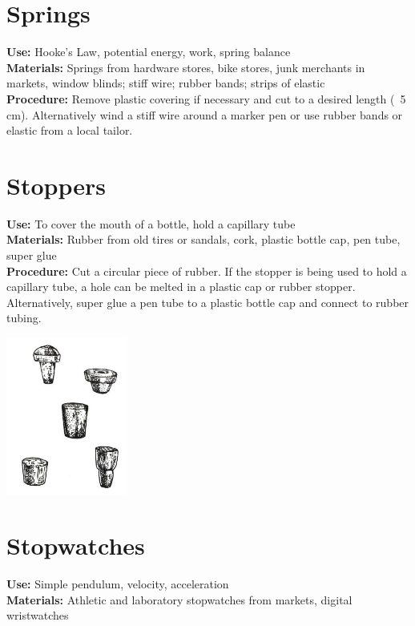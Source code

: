 \begin{multicols}{2}
\section{Springs} 
\label{sec:springs}
\vspace{-10pt}
\textbf{Use:} Hooke's Law, potential energy, work, spring balance\\
\textbf{Materials:} Springs from hardware stores, bike stores, junk merchants in markets, window blinds; stiff wire; rubber bands; strips of elastic\\
\textbf{Procedure:} Remove plastic covering if necessary and cut to a desired length (~5 cm). Alternatively wind a stiff wire around a marker pen or use rubber bands or elastic from a local tailor.

\section{Stoppers} 
\label{sec:stoppers}
\vspace{-10pt}
\textbf{Use:} To cover the mouth of a bottle, hold a capillary tube\\
\textbf{Materials:} Rubber from old tires or sandals, cork, plastic bottle cap, pen tube, super glue\\
\textbf{Procedure:} Cut a circular piece of rubber.  If the stopper is being used to hold a capillary tube, a hole can be melted in a plastic cap or rubber stopper. Alternatively, super glue a pen tube to a plastic bottle cap and connect to rubber tubing.
\begin{center}
\includegraphics[width=0.3\textwidth]{./img/source/stoppers.jpg}
\end{center}

\section{Stopwatches} 
\label{sec:stopwatches}
\vspace{-10pt}
\textbf{Use:} Simple pendulum, velocity, acceleration\\
\textbf{Materials:} Athletic and laboratory stopwatches from markets, digital wristwatches


\end{multicols}
